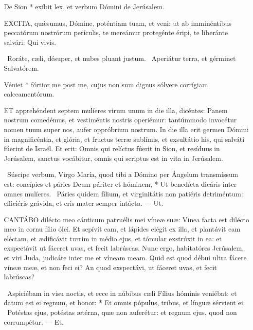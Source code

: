  De Sion * exíbit lex, et verbum Dómini de Jerúsalem.


\lettrine[lines=2]{E}{XCITA}, quǽsumus, Dómine, poténtiam tuam, et veni: ut ab imminéntibus peccatórum nostrórum perículis, te mereámur protegénte éripi, te liberánte salvári: Qui vivis.

\V\ Roráte, cæli, désuper, et nubes pluant justum. \R\ Aperiátur terra, et gérminet Salvatórem.

 Véniet * fórtior me post me, cujus non sum dignus sólvere corrígiam calceamentórum.




\lettrine[lines=2]{E}{T} apprehéndent septem mulíeres virum unum in die illa, dicéntes: Panem nostrum comedémus, et vestiméntis nostris operiémur: tantúmmodo invocétur nomen tuum super nos, aufer oppróbrium nostrum. In die illa erit germen Dómini in magnificéntia, et glória, et fructus terræ sublímis, et exsultátio his, qui salváti fúerint de Israël. Et erit: Omnis qui relíctus fúerit in Sion, et resíduus in Jerúsalem, sanctus vocábitur, omnis qui scriptus est in vita in Jerúsalem.

\R\ Súscipe verbum, Virgo María, quod tibi a Dómino per Ángelum transmíssum est: concípies et páries Deum páriter et hóminem, * Ut benedícta dicáris inter omnes mulíeres. \V\ Páries quidem fílium, et virginitátis non patiéris detriméntum: efficiéris grávida, et eris mater semper intácta. --- Ut.


\lettrine[lines=2]{C}{ANTÁBO} dilécto meo cánticum patruélis mei víneæ suæ: Vínea facta est dilécto meo in cornu fílio ólei. Et sepívit eam, et lápides elégit ex illa, et plantávit eam eléctam, et ædificávit turrim in médio ejus, et tórcular exstrúxit in ea: et exspectávit ut fáceret uvas, et fecit labrúscas. Nunc ergo, habitatóres Jerúsalem, et viri Juda, judicáte inter me et víneam meam. Quid est quod débui ultra fácere víneæ meæ, et non feci ei? An quod exspectávi, ut fáceret uvas, et fecit labrúscas?

\R\ Aspiciébam in visu noctis, et ecce in núbibus cæli Fílius hóminis veniébat: et datum est ei regnum, et honor: * Et omnis pópulus, tribus, et línguæ sérvient ei. \V\ Potéstas ejus, potéstas ætérna, quæ non auferétur: et regnum ejus, quod non corrumpétur. --- Et.

